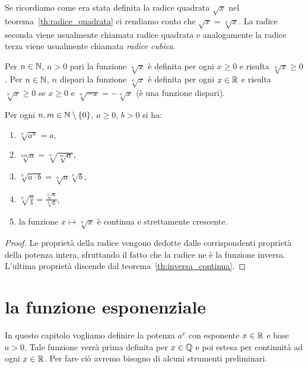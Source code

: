 Se ricordiamo come era stata definita la radice quadrata $\sqrt x$ nel
teorema~\ref{th:radice_quadrata} ci rendiamo conto che
$\sqrt {x} = \sqrt[2]{x}$.
La radice seconda viene usualmente chiamata radice quadrata e
analogamente la radice terza viene usualmente chiamata \emph{radice cubica}.

\begin{theorem}
Per $n\in \mathbb N$, $n>0$ pari la funzione $\sqrt[n]{x}$
è definita per ogni $x\ge 0$ e risulta $\sqrt[n]{x}\ge 0$.
Per $n\in \mathbb N$, $n$ dispari la funzione $\sqrt[n]{x}$
è definita per ogni $x\in \mathbb R$ e risulta $\sqrt[n]{x}\ge 0$
se $x\ge 0$ e $\sqrt[n]{-x} =-\sqrt[n]{x}$
(è una funzione dispari).


Per ogni $n,m \in \mathbb N\setminus{\left\{ 0 \right\}}$, $a\ge 0$, $b>0$ si ha:
\begin{enumerate}
\item $\sqrt[n]{a^n} = a$,
\item $\displaystyle \sqrt[nm]{a} = \sqrt[n]{\sqrt[m]{a}}$,
\item $\displaystyle \sqrt[n]{a\cdot b} = \sqrt[n]{a}\sqrt[n]{b}$,
\item $\displaystyle \sqrt[n]{\frac a b} = \frac{\sqrt[n]{a}}{\sqrt[n]{b}}$,
\item la funzione $x\mapsto \sqrt[n]{x}$ è continua e strettamente crescente.
\end{enumerate}
\end{theorem}

\begin{proof}
Le proprietà della radice vengono dedotte dalle corrispondenti proprietà
della potenza intera, sfruttando il fatto che la radice
ne è la funzione inversa.
L'ultima proprietà discende dal teorema~\ref{th:inversa_continua}.
\end{proof}

\section{la funzione esponenziale}

In questo capitolo vogliamo definire la potenza $a^x$
con esponente $x\in \mathbb R$ e base $a>0$.
Tale funzione verrà prima definita per $x\in \mathbb Q$ e poi
estesa per continuità ad ogni $x \in \mathbb R$.
Per fare ciò avremo bisogno di alcuni strumenti preliminari.

